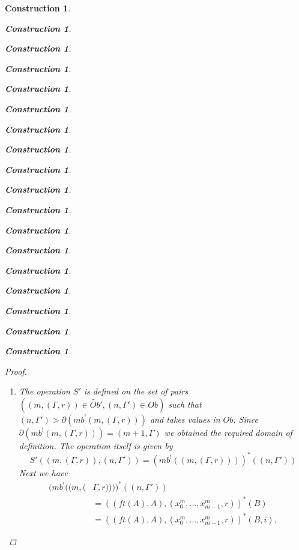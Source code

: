 \documentclass[12pt]{amsart}
\numberwithin{proposition}{subsection}
\newtheorem{construction}[proposition]{Construction}
\newcommand{\llabel}[1]{\label{#1}}
\newcommand{\wt}{\widetilde}
\begin{document}
\begin{construction}
\begin{construction}
\begin{construction}
\begin{construction}
\begin{construction}
\begin{construction}
\begin{construction}
\begin{construction}
\begin{construction}
\begin{construction}
\begin{construction}
\begin{construction}
\begin{construction}
\begin{construction}
\begin{construction}
\begin{construction}
\begin{construction}
\begin{construction}
\begin{proof}
\begin{enumerate}
To verify the formula for the operation itself consider the equalities:
%
\begin{equation*}
  \begin{split}
    \wt{T}'((&m,\Gamma),(n,(\Gamma',s)))=mb(p_{(m,\Gamma)}^*(mb^!(n,(\Gamma',s))))\\&=
    mb(p_{(m,\Gamma)}^*((ft((n+1,\Gamma')),((n+1,\Gamma'),(x^{n}_0,\dots,x^{n}_{n-1},s))))),
  \end{split}
\end{equation*}
%
where the first equality is by Definition \ref{2015.08.26.def1}(2). By Lemma
\ref{2015.09.03.l1} we can extend these equalities as follows:
\begin{equation*}
  \begin{split}
    mb(&p_{(m,\Gamma)}^*((ft((n+1,\Gamma')),((n+1,\Gamma'),(x^{n}_0,\dots,x^{n}_{n-1},s)))))\\&=
       mb(p_{X}^*(ft(Y)),(p_{X}^*(Y),(x^{n+1}_0,\dots,x^{n+1}_{n},(qq^{n-m+1}(\iota^1_{m-1}))(s))))\\&=
       (n+1,(p_{X}^*(Y),\partial_{n}^{m-1}(s)))\\&=
       (n+1,(T((m,\Gamma),(n+1,\Gamma')),\partial_n^{m-1}(s))),
  \end{split}
\end{equation*}
where $X=(m,\Gamma)$, $Y=(n+1,\Gamma')$, the first equality is by Lemma
\ref{2015.09.03.l1}, the second by Lemma \ref{2015.08.26.l3a} and the third by
Definition \ref{2015.08.26.def1}(1).
%
\item The operation $S'$ is defined on the set of pairs $((m,(\Gamma,r))\in
  \wt{Ob}',(n,\Gamma')\in Ob)$ such that
  $(n,\Gamma')>\partial(mb^!(m,(\Gamma,r)))$ and takes values in $Ob$. Since
  $\partial(mb^!(m,(\Gamma,r)))=(m+1,\Gamma)$ we obtained the required domain
  of definition. The operation itself is given by
%
\begin{equation}\llabel{2016.01.21.eq2}
S'((m,(\Gamma,r)),(n,\Gamma'))=(mb^!((m,(\Gamma,r))))^*((n,\Gamma'))
\end{equation}%
%
Next we have 
%
\begin{equation*}
  \begin{split}
    (mb^!((m,(&\Gamma,r))))^*((n,\Gamma'))
    \\&=
    ((ft(A),A),(x^{m}_0,\dots,x^{m}_{m-1},r))^*(B)
    \\&=
    ((ft(A),A),(x^{m}_0,\dots,x^{m}_{m-1},r))^*(B,i),
  \end{split}
\end{equation*}

\end{enumerate}
\end{proof}
\end{construction}
\end{construction}
\end{construction}
\end{construction}
\end{construction}
\end{construction}
\end{construction}
\end{construction}
\end{construction}
\end{construction}
\end{construction}
\end{construction}
\end{construction}
\end{construction}
\end{construction}
\end{construction}
\end{construction}
\end{construction}
\end{document}
